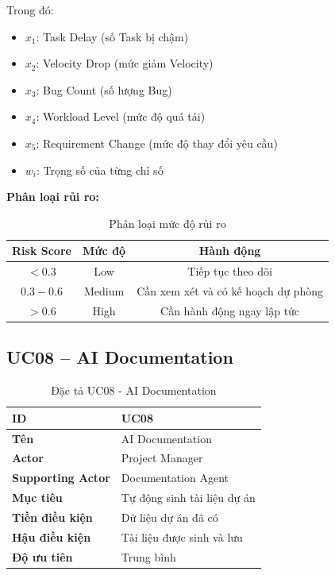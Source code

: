 \documentclass[12pt,a4paper]{report}
\begin{document}
Trong đó:
\begin{itemize}
\item \(x_1\): Task Delay (số Task bị chậm)
\item \(x_2\): Velocity Drop (mức giảm Velocity)
\item \(x_3\): Bug Count (số lượng Bug)
\item \(x_4\): Workload Level (mức độ quá tải)
\item \(x_5\): Requirement Change (mức độ thay đổi yêu cầu)
\item \(w_i\): Trọng số của từng chỉ số
\end{itemize}

\textbf{Phân loại rủi ro:}

\begin{table}[H]
\centering
\caption{Phân loại mức độ rủi ro}
\begin{tabular}{|c|c|c|}
\hline
\textbf{Risk Score} & \textbf{Mức độ} & \textbf{Hành động} \\
\hline
$< 0.3$ & Low & Tiếp tục theo dõi \\
\hline
$0.3 - 0.6$ & Medium & Cần xem xét và có kế hoạch dự phòng \\
\hline
$> 0.6$ & High & Cần hành động ngay lập tức \\
\hline
\end{tabular}
\label{tab:risk_levels}
\end{table}

\subsection{UC08 -- AI Documentation}

\begin{table}[H]
\centering
\caption{Đặc tả UC08 - AI Documentation}
\begin{tabular}{|p{4cm}|p{11cm}|}
\hline
\textbf{ID} & UC08 \\
\hline
\textbf{Tên} & AI Documentation \\
\hline
\textbf{Actor} & Project Manager \\
\hline
\textbf{Supporting Actor} & Documentation Agent \\
\hline
\textbf{Mục tiêu} & Tự động sinh tài liệu dự án \\
\hline
\textbf{Tiền điều kiện} & Dữ liệu dự án đã có \\
\hline
\textbf{Hậu điều kiện} & Tài liệu được sinh và lưu \\
\hline
\textbf{Độ ưu tiên} & Trung bình \\
\hline
\end{tabular}
\end{table}
\end{document}
